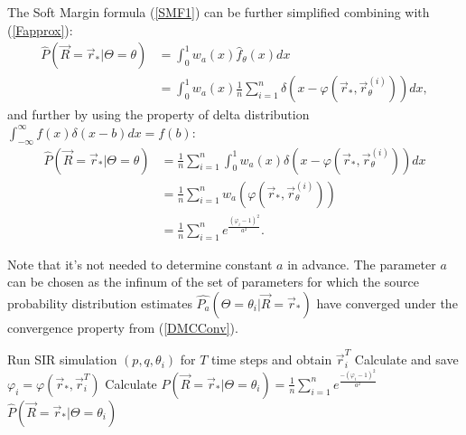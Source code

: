 \documentclass[times, utf8, diplomski]{fer}
\begin{document}
The Soft Margin formula (\ref{SMF1}) can be further simplified combining with (\ref{Fapprox}):
\begin{equation}
\begin{aligned}
\hat{P}(\vec R = \vec r_* | \Theta = \theta) &= \int_0^1 w_a(x)\hat{f}_\theta(x)dx \\ &=
\int_0^1 w_a(x) \frac{1}{n} \sum_{i = 1}^{n}\delta(x - \varphi(\vec r_*, \vec r_{\theta}^{(i)})) dx,
\end{aligned}
\end{equation}
and further by using the property of delta distribution $\int_{-\infty}^{\infty} f(x)\delta(x - b)dx = f(b)$:
\begin{equation}
\begin{aligned}
\hat{P}(\vec R = \vec r_* | \Theta = \theta) &= \frac{1}{n} \sum_{i = 1}^{n} \int_0^1 w_a(x) \delta(x - \varphi(\vec r_*, \vec r_{\theta}^{(i)})) dx  \\ &= \frac{1}{n} \sum_{i = 1}^{n}  w_a(\varphi(\vec  r_*, \vec r_\theta^{(i)})) \\ &= \frac{1}{n} \sum_{i = 1}^{n} e ^{\frac{(\varphi_i -1)^2}{a ^2}}.
\end{aligned}
\end{equation}

Note that it's not needed to determine constant $a$ in advance. The parameter $a$ can be chosen as the infinum of the set of parameters for which the source probability distribution estimates $\hat{P_a}(\Theta = \theta_i | \vec R = \vec r_*)$ have converged under the convergence property from (\ref{DMCConv}). 

\vspace{5mm}
\begin{algorithm}[H]
  {
    Run SIR simulation $(p, q, \theta_i)$ for $T$ time steps and obtain  
    $\vec r_i^T$\;
    Calculate and save $\varphi_i = \varphi(\vec r_*, \vec r_i^T)$\;
 }
  Calculate $\hat{P}(\vec R = \vec r_* | \Theta = \theta_i) = \frac{1}{n} \sum_{i = 1}^{n} e ^ {\frac{-(\varphi_i -1)^2}{a^2}}$\;
  \Return $\hat{P}(\vec R = \vec r_* | \Theta = \theta_i)$
 \label{DMC_lag}
 \caption{Soft Margin estimation of $P(\vec R = \vec r_* | \Theta = \theta_i)$ for a fixed source $\theta_i$.}
\end{algorithm}
 \AlgoDontDisplayBlockMarkers%
\end{document}
